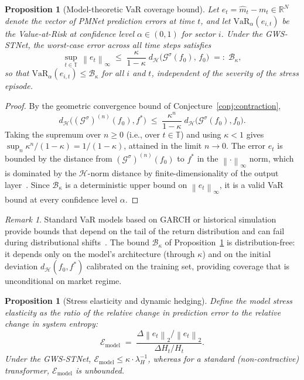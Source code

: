 \documentclass[11pt,a4paper]{article}  %
\newcommand{\R}{\mathbb{R}}
\newcommand{\norm}[1]{\left\lVert#1\right\rVert}
\theoremstyle{plain}
\newtheorem{proposition}[theorem]{Proposition}
\theoremstyle{definition}
\theoremstyle{remark}
\newtheorem{remark}{Remark}[section]
\begin{document}
\begin{proposition}[Model-theoretic VaR coverage bound]
\label{prop:var}
Let $e_t = \hat{m}_t - m_t \in \R^N$ denote the vector of PMNet
prediction errors at time $t$, and let
$\mathrm{VaR}_\alpha(e_{i,t})$ be the Value-at-Risk at confidence
level $\alpha \in (0,1)$ for sector $i$. Under the GWS-STNet, the
worst-case error across all time steps satisfies
\[
   \sup_{t\in\mathbb{T}}\,\norm{e_t}_\infty
   \;\leq\; \frac{\kappa}{1-\kappa}\;
   d_{\mathcal{H}}\!\bigl(\mathcal{G}^{\sigma}(f_0),\,f_0\bigr)
   \;=:\; \mathcal{B}_{\kappa},
\]
so that $\mathrm{VaR}_\alpha(e_{i,t}) \leq \mathcal{B}_\kappa$
for all $i$ and $t$, independent of the severity of the stress
episode.
\end{proposition}

\begin{proof}
By the geometric convergence bound of Conjecture~\ref{conj:contraction},
\[
   d_{\mathcal{H}}\!\bigl((\mathcal{G}^{\sigma})^{(n)}(f_0),f^*\bigr)
   \;\leq\; \frac{\kappa^n}{1-\kappa}\;
   d_{\mathcal{H}}\!\bigl(\mathcal{G}^{\sigma}(f_0),f_0\bigr).
\]
Taking the supremum over $n \geq 0$ (i.e., over $t \in \mathbb{T}$)
and using $\kappa < 1$ gives $\sup_n \kappa^n/(1-\kappa) = 1/(1-\kappa)$,
attained in the limit $n\to 0$. The error $e_t$ is bounded by the
distance from $(\mathcal{G}^{\sigma})^{(n)}(f_0)$ to $f^*$ in the
$\norm{\cdot}_\infty$ norm, which is dominated by the
$\mathcal{H}$-norm distance by finite-dimensionality of the output
layer~\cite{Reed1980}. Since $\mathcal{B}_\kappa$ is a deterministic
upper bound on $\norm{e_t}_\infty$, it is a valid VaR bound at every
confidence level $\alpha$.
\end{proof}

\begin{remark}
Standard VaR models based on GARCH or historical simulation provide
bounds that depend on the tail of the return distribution and can
fail during distributional shifts~\cite{McNeil2015}. The bound
$\mathcal{B}_\kappa$ of Proposition~\ref{prop:var} is
distribution-free: it depends only on the model's architecture
(through $\kappa$) and on the initial deviation $d_\mathcal{H}(f_0,f^*)$
calibrated on the training set, providing coverage that is
unconditional on market regime.
\end{remark}

\begin{proposition}[Stress elasticity and dynamic hedging]
\label{prop:elasticity}
Define the \emph{model stress elasticity} as the ratio of the
relative change in prediction error to the relative change in
system entropy:
\[
   \mathcal{E}_{\mathrm{model}}
   \;=\; \frac{\Delta\norm{e_t}_2 / \norm{e_t}_2}
              {\Delta H_t / H_t}.
\]
Under the GWS-STNet, $\mathcal{E}_{\mathrm{model}} \leq \kappa \cdot
\lambda_H^{-1}$, whereas for a standard (non-contractive) transformer,
$\mathcal{E}_{\mathrm{model}}$ is unbounded.
\end{proposition}
\end{document}
